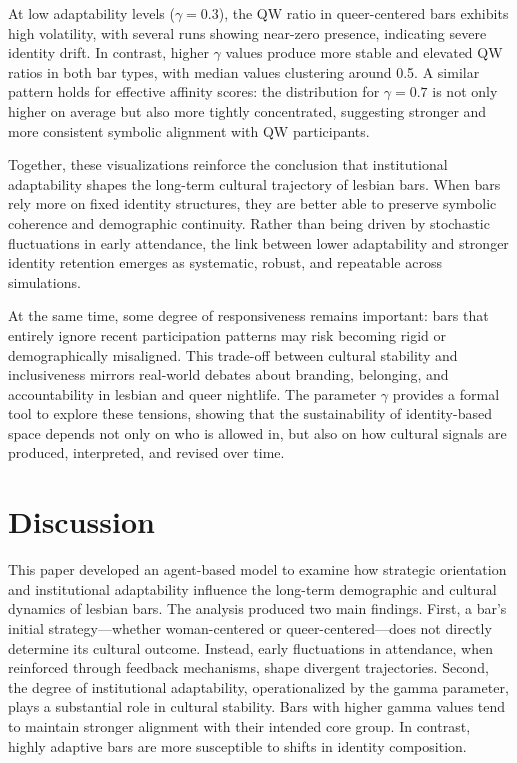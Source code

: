 \documentclass{article}
\begin{document}
At low adaptability levels ($\gamma = 0.3$), the QW ratio in queer-centered bars exhibits high volatility, with several runs showing near-zero presence, indicating severe identity drift. In contrast, higher $\gamma$ values produce more stable and elevated QW ratios in both bar types, with median values clustering around 0.5. A similar pattern holds for effective affinity scores: the distribution for $\gamma = 0.7$ is not only higher on average but also more tightly concentrated, suggesting stronger and more consistent symbolic alignment with QW participants.

Together, these visualizations reinforce the conclusion that institutional adaptability shapes the long-term cultural trajectory of lesbian bars. When bars rely more on fixed identity structures, they are better able to preserve symbolic coherence and demographic continuity. Rather than being driven by stochastic fluctuations in early attendance, the link between lower adaptability and stronger identity retention emerges as systematic, robust, and repeatable across simulations.

At the same time, some degree of responsiveness remains important: bars that entirely ignore recent participation patterns may risk becoming rigid or demographically misaligned. This trade-off between cultural stability and inclusiveness mirrors real-world debates about branding, belonging, and accountability in lesbian and queer nightlife. The parameter $\gamma$ provides a formal tool to explore these tensions, showing that the sustainability of identity-based space depends not only on who is allowed in, but also on how cultural signals are produced, interpreted, and revised over time.

\section{Discussion}

This paper developed an agent-based model to examine how strategic orientation and institutional adaptability influence the long-term demographic and cultural dynamics of lesbian bars. The analysis produced two main findings. First, a bar’s initial strategy—whether woman-centered or queer-centered—does not directly determine its cultural outcome. Instead, early fluctuations in attendance, when reinforced through feedback mechanisms, shape divergent trajectories. Second, the degree of institutional adaptability, operationalized by the gamma parameter, plays a substantial role in cultural stability. Bars with higher gamma values tend to maintain stronger alignment with their intended core group. In contrast, highly adaptive bars are more susceptible to shifts in identity composition.
\end{document}
